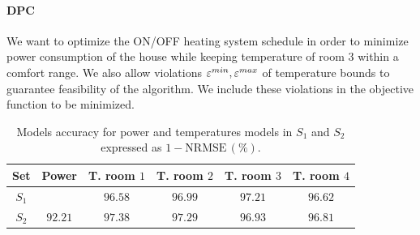 \paragraph{DPC}
We want to optimize the ON/OFF heating system schedule in order to minimize power consumption of the house while keeping temperature of room $3$ within a comfort range. We also allow violations $\varepsilon^{min},\varepsilon^{max}$  of temperature bounds to guarantee feasibility of the algorithm. We include these violations in the objective function to be minimized.
\begin{table}[t!]
	\centering
	\begin{tabular}{cccccc}
		\toprule
		Set       & Power   & T. room $1$ & T. room $2$ & T. room $3$ & T. room $4$  \\ 
		\midrule
		$S_1$     &         & $96.58$     & $96.99$     & $97.21$     & $96.62$\\
		$S_2$     & $92.21$ & $97.38$     & $97.29$     & $96.93$     & $96.81$\\
		\bottomrule
	\end{tabular}
	\caption{Models accuracy for power and temperatures models in $S_1$ and $S_2$ expressed as $\mathrm{1-NRMSE}\,(\%)$.}
	\captionsetup{justification=centering}
	\label{T:S1accuracy}
	\vspace{-0.5cm}
\end{table}
